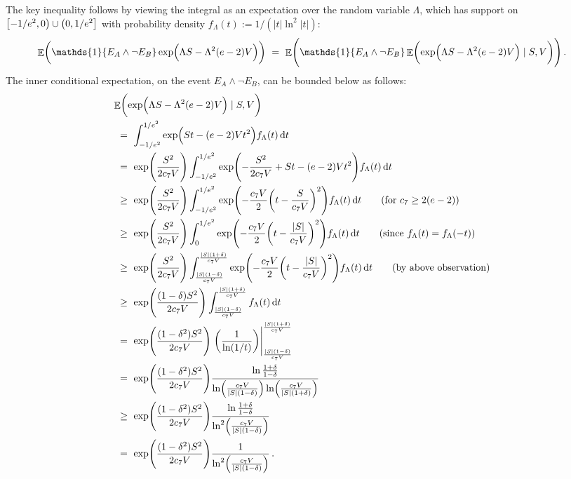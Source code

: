 \documentclass[11pt]{article}
\DeclareMathOperator{\E}{\mathbb{E}}
\theoremstyle{remark}
\theoremstyle{definition}
\renewcommand\abs[1]{|#1|} %
\newcommand\ind[1]{\ensuremath{\mathds{1}\{#1\}}}
\newcommand\Parens[1]{\mleft(#1\mright)}
\begin{document}
The key inequality follows by viewing the integral as an expectation
over the random variable $\Lambda$, which has support on
$\intco{-1/e^2,0} \cup \intoc{0,1/e^2}$ with probability density
$f_\Lambda(t) := 1/(\abs{t}\ln^2\abs{t})$:
\begin{align*}
  \E\Parens{
    \ind{E_A \wedge \neg E_B}
    \exp\Parens{ \Lambda S - \Lambda^2 (e-2) V }
  }
  & \ = \
  \E\Parens{
    \ind{E_A \wedge \neg E_B}
    \E\Parens{
      \exp\Parens{ \Lambda S - \Lambda^2 (e-2) V }
      \mid S,V
    }
  }
  \,.
\end{align*}
The inner conditional expectation, on the event $E_A \wedge \neg E_B$,
can be bounded below as follows:
\begin{align*}
  \lefteqn{
    \E\Parens{
      \exp\Parens{ \Lambda S - \Lambda^2 (e-2) V }
      \mid S,V
    }
  } \\
  & \ = \
  \int_{-1/e^2}^{1/e^2}
  \exp\Parens{ S t - (e-2) V t^2 }
  f_\Lambda(t) \dif{t}
  \\
  & \ = \
  \exp\Parens{\frac{S^2}{2c_7V}}
  \int_{-1/e^2}^{1/e^2}
  \exp\Parens{
    -\frac{S^2}{2c_7V}
    + S t - (e-2) V t^2
  }
  f_\Lambda(t) \dif{t}
  \\
  & \ \geq \
  \exp\Parens{\frac{S^2}{2c_7V}}
  \int_{-1/e^2}^{1/e^2}
  \exp\Parens{
    -\frac{c_7V}{2}
    \Parens{ t - \frac{S}{c_7V} }^2
  }
  f_\Lambda(t) \dif{t}
  \qquad \text{(for $c_7 \geq 2(e-2)$)}
  \\
  & \ \geq \
  \exp\Parens{\frac{S^2}{2c_7V}}
  \int_0^{1/e^2}
  \exp\Parens{
    -\frac{c_7V}{2}
    \Parens{ t - \frac{|S|}{c_7V} }^2
  }
  f_\Lambda(t) \dif{t}
  \qquad \text{(since $f_\Lambda(t) = f_\Lambda(-t)$)}
  \\
  & \ \geq \
  \exp\Parens{\frac{S^2}{2c_7V}}
  \int_{\frac{|S|(1-\delta)}{c_7V}}^{\frac{|S|(1+\delta)}{c_7V}}
  \exp\Parens{
    -\frac{c_7V}{2}
    \Parens{ t - \frac{|S|}{c_7V} }^2
  }
  f_\Lambda(t) \dif{t}
  \qquad \text{(by above observation)}
  \\
  & \ \geq \
  \exp\Parens{\frac{(1-\delta)S^2}{2c_7V}}
  \int_{\frac{|S|(1-\delta)}{c_7V}}^{\frac{|S|(1+\delta)}{c_7V}}
  f_\Lambda(t) \dif{t}
  \\
  & \ = \
  \exp\Parens{\frac{(1-\delta^2)S^2}{2c_7V}}
  \left.
  \Parens{
    \frac{1}{\ln(1/t)}
  }
  \right\vert_{\frac{|S|(1-\delta)}{c_7V}}^{\frac{|S|(1+\delta)}{c_7V}}
  \\
  & \ = \
  \exp\Parens{\frac{(1-\delta^2)S^2}{2c_7V}}
  \frac{\ln\frac{1+\delta}{1-\delta}}
  {\ln\Parens{\frac{c_7V}{|S|(1-\delta)}}\ln\Parens{\frac{c_7V}{|S|(1+\delta)}}}
  \\
  & \ \geq \
  \exp\Parens{\frac{(1-\delta^2)S^2}{2c_7V}}
  \frac{\ln\frac{1+\delta}{1-\delta}}
  {\ln^2\Parens{\frac{c_7V}{|S|(1-\delta)}}}
  \\
  & \ = \
  \exp\Parens{\frac{(1-\delta^2)S^2}{2c_7V}}
  \frac{1}{\ln^2\Parens{\frac{c_7V}{|S|(1-\delta)}}}
  \,.
\end{align*}
\end{document}
